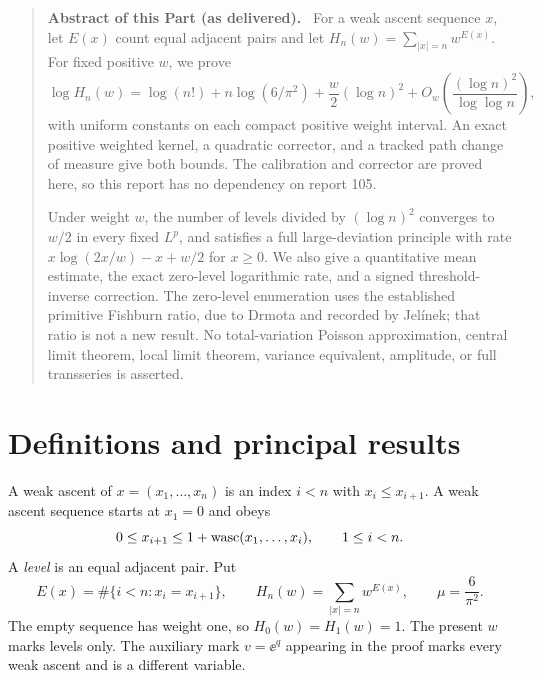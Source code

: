 \documentclass[11pt,a4paper]{article}
\theoremstyle{remark}\newtheorem{remark}[theorem]{Remark}
\numberwithin{equation}{section}
\newenvironment{partabstract}{\begin{quote}\small\noindent\textbf{Abstract of this Part (as delivered).}\ }{\end{quote}}
\begin{document}
\begin{partabstract}
For a weak ascent sequence $x$, let $E(x)$ count equal adjacent pairs and let
$H_n(w)=\sum_{|x|=n}w^{E(x)}$. For fixed positive $w$, we prove
\[
\log H_n(w)=\log(n!)+n\log(6/\pi^2)+\frac w2(\log n)^2
+O_w\!\left(\frac{(\log n)^2}{\log\log n}\right),
\]
with uniform constants on each compact positive weight interval. An exact positive weighted kernel, a quadratic corrector, and a tracked path change of measure give both bounds. The calibration and corrector are proved here, so this report has no dependency on report 105.

Under weight $w$, the number of levels divided by $(\log n)^2$ converges to $w/2$ in every fixed $L^p$, and satisfies a full large-deviation principle with rate
$x\log(2x/w)-x+w/2$ for $x\ge0$. We also give a quantitative mean estimate, the exact zero-level logarithmic rate, and a signed threshold-inverse correction. The zero-level enumeration uses the established primitive Fishburn ratio, due to Drmota and recorded by Jel\'inek; that ratio is not a new result. No total-variation Poisson approximation, central limit theorem, local limit theorem, variance equivalent, amplitude, or full transseries is asserted.
\end{partabstract}

\section{Definitions and principal results}\label{wasc:lv:sec:results}
A weak ascent of $x=(x_1,\ldots,x_n)$ is an index $i<n$ with $x_i\le x_{i+1}$.
A weak ascent sequence starts at $x_1=0$ and obeys
\begin{equation}\label{wasc:lv:eq:def}
0\le x_{i+1}\le1+\operatorname{wasc}(x_1,\ldots,x_i),\qquad 1\le i<n.
\end{equation}
A \emph{level} is an equal adjacent pair. Put
\[
E(x)=\#\{i<n:x_i=x_{i+1}\},\qquad
H_n(w)=\sum_{|x|=n}w^{E(x)},\qquad \mu=\frac6{\pi^2}.
\]
The empty sequence has weight one, so $H_0(w)=H_1(w)=1$.
The present $w$ marks levels only. The auxiliary mark $v=\ee^q$ appearing in the proof marks every weak ascent and is a different variable.
\end{document}
